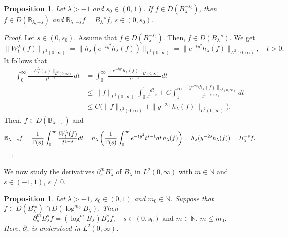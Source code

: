 \documentclass[a4paper,10pt, reqno]{amsart}
\newtheorem{prop}[thm]{Proposition}
\theoremstyle{definition}
\theoremstyle{remark}
\numberwithin{equation}{section}
\begin{document}
\begin{prop}\label{prop: Prop2.2}
 Let $\lambda >-1$ and $s_0\in (0,1)$. If $f\in D(B_\lambda^{-s_0})$, then $f\in D(\mathbb B_{\lambda ,-s})$ and $\mathbb B_{\lambda ,-s}f=B_\lambda^{-s}f$, $s\in (0,s_0)$.     
\end{prop}
\begin{proof}
    Let $s\in (0,s_0)$. Assume that $f\in D(B_\lambda^{-s_0})$. Then, $f\in D(B_\lambda^{-s})$. We get
\[
\|W_t^\lambda (f)\|_{L^2 (0,\infty)}=\|h_\lambda (e^{-ty^2}h_\lambda (f))\|_{L^2(0,\infty)}=\|e^{-ty^2}h_\lambda (f)\|_{L^2(0,\infty)},\quad t>0.
\]
It follows that
\begin{align*}
    \int_0^\infty \frac{\|W_t^\lambda (f)\|_{L^2(0,\infty)}}{t^{1-s}}dt&=\int_0^\infty \frac{\|e^{-ty^2}h_\lambda (f)\|_{L^2(0,\infty)}}{t^{1-s}}dt\\
    &\leq \|f\|_{L^2(0,\infty)}\int_0^1\frac{dt}{t^{1-s}}+C\int_1^\infty \frac{\|y^{-2s_0}h_\lambda (f)\|_{L^2(0,\infty)}}{t^{1-s+s_0}}dt\\
    &\leq C\Big(\|f\|_{L^2(0,\infty)}+\|y^{-2s_0}h_\lambda (f)\|_{L^2(0,\infty)}\Big).
\end{align*}
Then, $f\in D(\mathbb B_{\lambda ,-s})$ and 
\[
\mathbb B_{\lambda ,-s}f=\frac{1}{\Gamma (s)}\int_0^\infty \frac{W_t^\lambda (f)}{t^{1-s}}dt=h_\lambda \left(\frac{1}{\Gamma (s)}\int_0^\infty e^{-ty^2}t^{s-1}dt\,h_\lambda (f)\right)=h_\lambda (y^{-2s}h_\lambda (f))=B_\lambda^{-s}f.\qedhere
\]
\end{proof}
We now study the derivatives $\partial_s^m B_\lambda^s$ of $B_\lambda^s$ in $L^2(0,\infty)$ with $m\in \mathbb N$ and $s\in (-1,1)$, $s\neq 0$.

\begin{prop}\label{prop: Prop2.3}
    Let $\lambda >-1$, $s_0\in (0,1)$ and $m_0\in \mathbb N$. Suppose that $f\in D(B_\lambda^{s_0})\cap D(\log^{m_0}B_\lambda)$. Then
    \[
    \partial_s^m B_\lambda^sf=(\log^m B_\lambda)B_\lambda^sf,\quad s\in (0,s_0)\mbox{ and }m\in \mathbb N,\,m\leq m_0.
    \] 
 Here, $\partial_s$ is understood in $L^2(0,\infty)$.
\end{prop}
\end{document}
